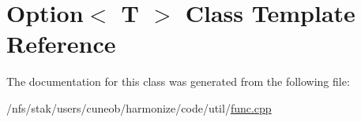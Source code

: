 \hypertarget{classOption}{\section{Option$<$ T $>$ Class Template Reference}
\label{classOption}
}


The documentation for this class was generated from the following file\-:\begin{DoxyCompactItemize}
\item 
/nfs/stak/users/cuneob/harmonize/code/util/\hyperlink{func_8cpp}{func.\-cpp}\end{DoxyCompactItemize}
